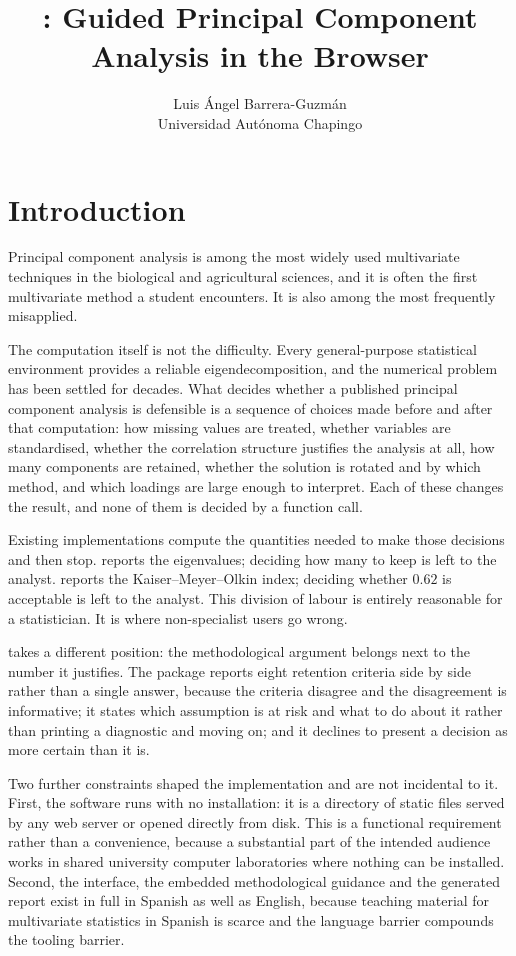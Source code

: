 \documentclass[article]{jss}
\author{Luis \'Angel Barrera-Guzm\'an\\Universidad Aut\'onoma Chapingo}
\title{\pkg{PCAPro}: Guided Principal Component Analysis in the Browser}
\begin{document}
\section{Introduction} \label{sec:intro}

Principal component analysis \citep{pearson1901, hotelling1933, jolliffe2002} is
among the most widely used multivariate techniques in the biological and
agricultural sciences, and it is often the first multivariate method a student
encounters. It is also among the most frequently misapplied.

The computation itself is not the difficulty. Every general-purpose statistical
environment provides a reliable eigendecomposition, and the numerical problem has
been settled for decades. What decides whether a published principal component
analysis is defensible is a sequence of choices made before and after that
computation: how missing values are treated, whether variables are standardised,
whether the correlation structure justifies the analysis at all, how many
components are retained, whether the solution is rotated and by which method, and
which loadings are large enough to interpret. Each of these changes the result,
and none of them is decided by a function call.

Existing implementations compute the quantities needed to make those decisions and
then stop.  \citep{le2008} reports the eigenvalues; deciding how many
to keep is left to the analyst.  \citep{psych} reports the
Kaiser--Meyer--Olkin index; deciding whether $0.62$ is acceptable is left to the
analyst. This division of labour is entirely reasonable for a statistician. It is
where non-specialist users go wrong.

 takes a different position: the methodological argument belongs next to
the number it justifies. The package reports eight retention criteria side by side
rather than a single answer, because the criteria disagree and the disagreement is
informative; it states which assumption is at risk and what to do about it rather
than printing a diagnostic and moving on; and it declines to present a decision as
more certain than it is.

Two further constraints shaped the implementation and are not incidental to it.
First, the software runs with no installation: it is a directory of static files
served by any web server or opened directly from disk. This is a functional
requirement rather than a convenience, because a substantial part of the intended
audience works in shared university computer laboratories where nothing can be
installed. Second, the interface, the embedded methodological guidance and the
generated report exist in full in Spanish as well as English, because teaching
material for multivariate statistics in Spanish is scarce and the language barrier
compounds the tooling barrier.
\end{document}
